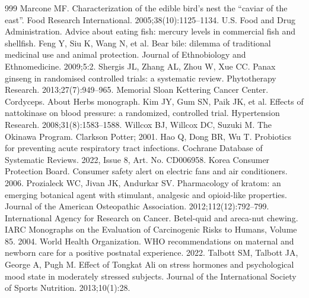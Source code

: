 \documentclass[11pt,oneside]{book}
\begin{document}
\begin{thebibliography}{999}
Marcone MF. Characterization of the edible bird's nest the ``caviar of the east''. Food Research International. 2005;38(10):1125--1134.
U.S. Food and Drug Administration. Advice about eating fish: mercury levels in commercial fish and shellfish.
Feng Y, Siu K, Wang N, et al. Bear bile: dilemma of traditional medicinal use and animal protection. Journal of Ethnobiology and Ethnomedicine. 2009;5:2.
Shergis JL, Zhang AL, Zhou W, Xue CC. Panax ginseng in randomised controlled trials: a systematic review. Phytotherapy Research. 2013;27(7):949--965.
Memorial Sloan Kettering Cancer Center. Cordyceps. About Herbs monograph.
Kim JY, Gum SN, Paik JK, et al. Effects of nattokinase on blood pressure: a randomized, controlled trial. Hypertension Research. 2008;31(8):1583--1588.
Willcox BJ, Willcox DC, Suzuki M. The Okinawa Program. Clarkson Potter; 2001.
Hao Q, Dong BR, Wu T. Probiotics for preventing acute respiratory tract infections. Cochrane Database of Systematic Reviews. 2022, Issue 8, Art. No. CD006958.
Korea Consumer Protection Board. Consumer safety alert on electric fans and air conditioners. 2006.
Prozialeck WC, Jivan JK, Andurkar SV. Pharmacology of kratom: an emerging botanical agent with stimulant, analgesic and opioid-like properties. Journal of the American Osteopathic Association. 2012;112(12):792--799.
International Agency for Research on Cancer. Betel-quid and areca-nut chewing. IARC Monographs on the Evaluation of Carcinogenic Risks to Humans, Volume 85. 2004.
World Health Organization. WHO recommendations on maternal and newborn care for a positive postnatal experience. 2022.
Talbott SM, Talbott JA, George A, Pugh M. Effect of Tongkat Ali on stress hormones and psychological mood state in moderately stressed subjects. Journal of the International Society of Sports Nutrition. 2013;10(1):28.


\end{thebibliography}
\end{document}
